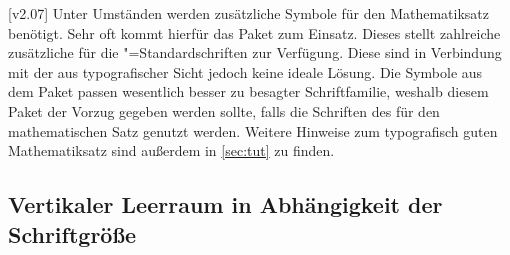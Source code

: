 \begin{DeclareEntity*}{}
\begin{DeclareEntity*}{}
\begin{DeclareEntity*}{}
\begin{Declaration}{}
\begin{Declaration}{}
\begin{Declaration}{}
\begin{Declaration}{}
\begin{Declaration}{}
\begin{Declaration}{}
\begin{Declaration}{}
\begin{Declaration}{}
\begin{Declaration}{}
\begin{Declaration}{}
\begin{Declaration}{}
\begin{Declaration}{}
\begin{Declaration}{}
\begin{Declaration}{}
\begin{Declaration}{}
\begin{Declaration}{}
\begin{Declaration}{}
\begin{Declaration}{}
\begin{Declaration}{}
\begin{Declaration}{}
\end{Declaration}
\end{Declaration}
\end{Declaration}
\end{Declaration}
\end{Declaration}
\end{Declaration}
\end{Declaration}
\end{Declaration}
\end{Declaration}
\end{Declaration}
\end{Declaration}
\end{Declaration}
\end{Declaration}
\end{Declaration}
\end{Declaration}
\end{Declaration}
\end{Declaration}
\end{Declaration}
\end{Declaration}
\end{Declaration}



[v2.07]%
Unter Umständen werden zusätzliche Symbole für den Mathematiksatz benötigt. 
Sehr oft kommt hierfür das Paket  zum Einsatz. Dieses stellt 
zahlreiche zusätzliche für die "=Standardschriften zur 
Verfügung. Diese sind in Verbindung mit der \OpenSans aus typografischer Sicht 
jedoch keine ideale Lösung. Die Symbole aus dem Paket  passen 
wesentlich besser zu besagter Schriftfamilie, weshalb diesem Paket der Vorzug 
gegeben werden sollte, falls die Schriften des \CDs für den mathematischen Satz 
genutzt werden. Weitere Hinweise zum typografisch guten Mathematiksatz sind 
außerdem in \autoref{sec:tut} zu finden.%
%



\subsection{%
  Vertikaler Leerraum in Abhängigkeit der Schriftgröße%
}


\end{DeclareEntity*}
\end{DeclareEntity*}
\end{DeclareEntity*}
